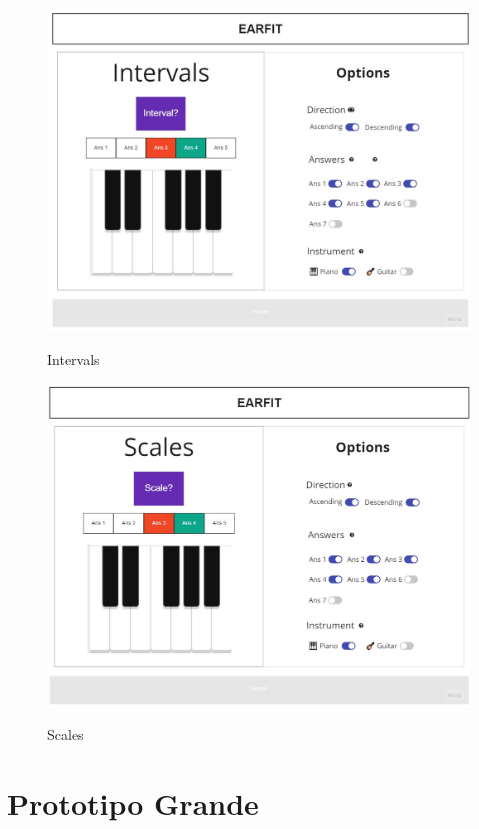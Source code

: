 \documentclass[12pt,twoside,titlepage]{report}
\begin{document}
{\begin{figure}[H]
    \centering
    \includegraphics[scale=0.3]{Design Thinking/Prototipo/Medium/Intervals}
    \label{fig:Intervals}
    \caption{Intervals}
\end{figure}

\begin{figure}[H]
    \centering
    \includegraphics[scale=0.3]{Design Thinking/Prototipo/Medium/Scales}
    \label{fig:Scales}
    \caption{Scales}
\end{figure}

\section{Prototipo Grande}

}
\end{document}
